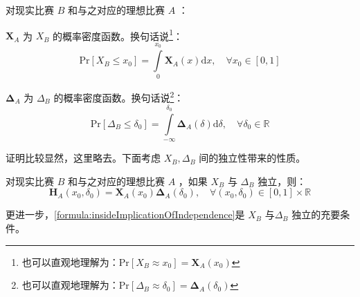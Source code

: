             \begin{proposition}[期望值分布函数和偏移量分布函数的实际含义]
                对现实比赛 $B$ 和与之对应的理想比赛 $A$ ：
                \begin{asparaitem}
                    \item $\bm{X}_A$ 为 $X_B$ 的概率密度函数。换句话说\footnote{也可以直观地理解为：$\mathrm{Pr}[X_B\approx x_0]=\bm{X}_A(x_0)$}：$$\mathrm{Pr}[X_B\leq x_0]=\int\limits_0^{x_0} \bm{X}_A(x)\mathrm{d}x,\quad\forall x_0\in[0,1]$$
                    \item $\bm{\Delta}_A$ 为 $\Delta_B$ 的概率密度函数。换句话说\footnote{也可以直观地理解为：$\mathrm{Pr}[\Delta_B\approx \delta_0]=\bm{\Delta}_A(\delta_0)$}：$$\mathrm{Pr}[\Delta_B\leq \delta_0]=\int\limits_{-\infty}^{\delta_0} \bm{\Delta}_A(\delta)\mathrm{d}\delta,\quad\forall \delta_0\in\mathbb{R}$$
                \end{asparaitem}
                \label{prop:marginalDistributionsMeaning}
            \end{proposition}

            证明比较显然，这里略去。下面考虑 $X_B,\Delta_B$ 间的独立性带来的性质。

            \begin{proposition}
                对现实比赛 $B$ 和与之对应的理想比赛 $A$ ，如果 $X_B$ 与 $\Delta_B$ 独立，则：
                \begin{equation}
                    \bm{H}_A(x_0,\delta_0)=\bm{X}_A(x_0)\bm{\Delta}_A(\delta_0),\quad\forall (x_0,\delta_0)\in[0,1]\times\mathbb{R}
                    \label{formula:insideImplicationOfIndependence}
                \end{equation}

                更进一步，\eqref{formula:insideImplicationOfIndependence}是 $X_B$ 与$\Delta_B$ 独立的充要条件。

                \label{prop:implicationOfIndependence}
            \end{proposition}

